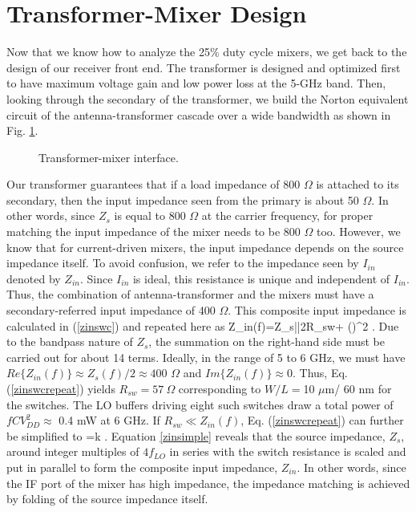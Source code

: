 \section{Transformer-Mixer Design}
Now that we know how to analyze the 25\% duty cycle mixers, we get back to the design of our receiver front end. The transformer is designed and
optimized first to have maximum voltage gain and low power loss at the 5-GHz band. Then, looking through the secondary of the transformer, we build
the Norton equivalent circuit of the antenna-transformer cascade over a wide bandwidth as shown in Fig. \ref{mixer}.
\begin{figure}[htb]
\vspace{3.7in}
\caption{Transformer-mixer interface.}
\label{mixer}
\end{figure}
Our transformer guarantees that if a load impedance of 800 $\Omega$ is attached to its secondary, then the input impedance seen from the primary is about
50 $\Omega$.  In other words, since $Z_s$ is equal to 800 $\Omega$ at the carrier frequency, for proper matching the input impedance of the mixer needs to be
800 $\Omega$ too. However, we know that for current-driven mixers, the input impedance depends on the source impedance itself. To avoid confusion, we
refer to the impedance seen by $I_{in}$ denoted by $Z_{in}$. Since $I_{in}$ is ideal, this resistance is unique and independent of $I_{in}$. Thus, the
combination of antenna-transformer and the mixers must have a secondary-referred input impedance of 400 $\Omega$. This composite input impedance is
calculated in (\ref{zinswc}) and repeated here as
\beq
Z_{in}(f)=Z_s||2R_{sw}+ ()^2 \div {}.
\label{zinswcrepeat}
\eeq
Due to the bandpass nature of $Z_s$, the summation on the right-hand side must be carried out for about 14 terms. Ideally, in the range of 5 to 6 GHz,
we must have $Re\{Z_{in}(f)\} \approx Z_s(f)/2 \approx 400$ $\Omega$ and $Im\{Z_{in}(f)\} \approx 0$. Thus, Eq. (\ref{zinswcrepeat})
yields $R_{sw}=57~\Omega$ corresponding to  $W/L=$10 $\mu$m/ 60 nm for the switches. The LO buffers driving eight such switches draw a total power of
$fCV_{DD}^2 \approx$ 0.4 mW at 6 GHz.
If $R_{sw} \ll Z_{in}(f)$, Eq. (\ref{zinswcrepeat}) can further be simplified to
\beq
{}=\SumAll k .
\label{zinsimple}
\eeq
Equation \ref{zinsimple} reveals that the source impedance, $Z_s$, around integer multiples of $4 f_{LO}$ in series with the switch resistance
is scaled and put in parallel to form the composite input impedance, $Z_{in}$. In other words, since the IF port of the mixer has high impedance, the
impedance matching is achieved by folding of the source impedance itself.



